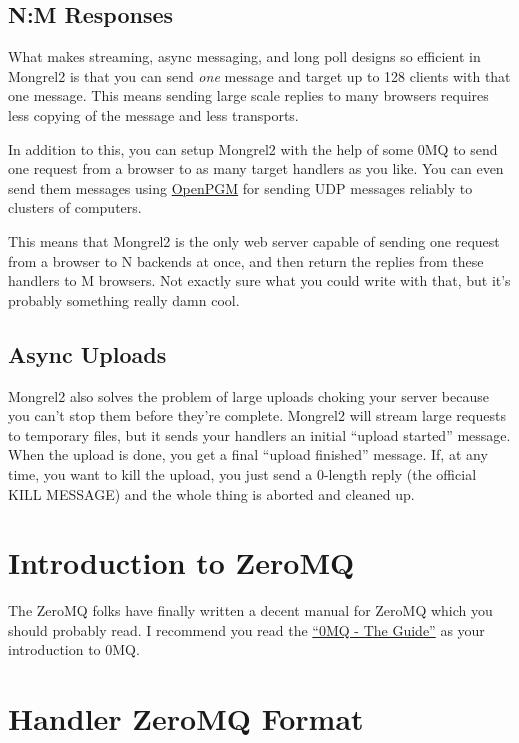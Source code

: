 \subsection{N:M Responses}

What makes streaming, async messaging, and long poll designs so efficient in Mongrel2 is that you can send
\emph{one} message and target up to 128 clients with that one message.  This means sending large scale replies
to many browsers requires less copying of the message and less transports.

In addition to this, you can setup Mongrel2 with the help of some 0MQ to send
one request from a browser to as many target handlers as you like.  You can
even send them messages using \href{http://code.google.com/p/openpgm/}{OpenPGM}
for sending UDP messages reliably to clusters of computers.

This means that Mongrel2 is the only web server capable of sending one request
from a browser to N backends at once, and then return the replies from these
handlers to M browsers.  Not exactly sure what you could write with that, but
it's probably something really damn cool.

\subsection{Async Uploads}

Mongrel2 also solves the problem of large uploads choking your server
because you can't stop them before they're complete.  Mongrel2 will stream
large requests to temporary files, but it sends your handlers an initial
``upload started'' message.  When the upload is done, you get a final ``upload 
finished'' message.  If, at any time, you want to kill the upload, you just
send a 0-length reply (the official KILL MESSAGE) and the whole thing is
aborted and cleaned up.


\section{Introduction to ZeroMQ}

The ZeroMQ folks have finally written a decent manual for ZeroMQ which you should
probably read.  I recommend you read the \href{http://zguide.zeromq.org/page:all}{``0MQ - The Guide''}
as your introduction to 0MQ.

\section{Handler ZeroMQ Format}

